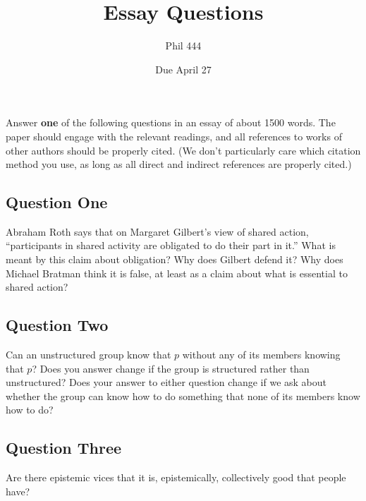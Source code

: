 \documentclass[
]{article}
\title{Essay Questions}
\author{Phil 444}
\date{Due April 27}
\begin{document}
\maketitle

Answer \textbf{one} of the following questions in an essay of about 1500
words. The paper should engage with the relevant readings, and all
references to works of other authors should be properly cited. (We don't
particularly care which citation method you use, as long as all direct
and indirect references are properly cited.)

\hypertarget{question-one}{%
\subsection*{Question One}\label{question-one}}

Abraham Roth says that on Margaret Gilbert's view of shared action,
``participants in shared activity are obligated to do their part in
it.'' What is meant by this claim about obligation? Why does Gilbert
defend it? Why does Michael Bratman think it is false, at least as a
claim about what is essential to shared action?

\hypertarget{question-two}{%
\subsection*{Question Two}\label{question-two}}

Can an unstructured group know that \(p\) without any of its members
knowing that \(p\)? Does you answer change if the group is structured
rather than unstructured? Does your answer to either question change if
we ask about whether the group can know how to do something that none of
its members know how to do?

\hypertarget{question-three}{%
\subsection*{Question Three}\label{question-three}}

Are there epistemic vices that it is, epistemically, collectively good
that people have?
\end{document}
